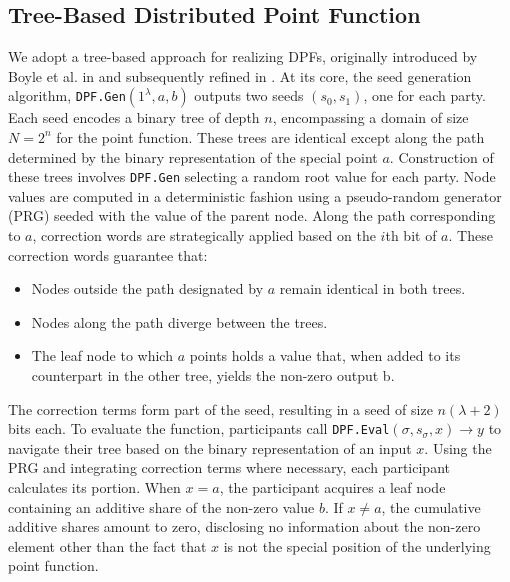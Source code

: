 \subsection{Tree-Based Distributed Point Function}
We adopt a tree-based approach for realizing DPFs, originally introduced by Boyle et al. in \cite{boyle2015function} and subsequently refined in \cite{boyle2016function}. At its core, the seed generation algorithm, \texttt{DPF.Gen}$(1^\lambda, a, b)$ outputs two seeds $(s_0, s_1)$, one for each party. Each seed encodes a binary tree of depth $n$, encompassing a domain of size $N=2^n$ for the point function. These trees are identical except along the path determined by the binary representation of the special point $a$. Construction of these trees involves \texttt{DPF.Gen} selecting a random root value for each party. Node values are computed in a deterministic fashion using a pseudo-random generator (PRG) seeded with the value of the parent node. Along the path corresponding to $a$, correction words are strategically applied based on the $i$th bit of $a$. These correction words guarantee that:
\begin{itemize}
\item Nodes outside the path designated by $a$ remain identical in both trees. 
\item Nodes along the path diverge between the trees.
\item The leaf node to which $a$ points holds a value that, when added to its counterpart in the other tree, yields the non-zero output b.
\end{itemize}
The correction terms form part of the seed, resulting in a seed of size $n(\lambda+2)$ bits each. To evaluate the function, participants call \texttt{DPF.Eval}$(\sigma, s_\sigma, x) \rightarrow y$ to navigate their tree based on the binary representation of an input $x$. Using the PRG and integrating correction terms where necessary, each participant calculates its portion. When $x=a$, the participant acquires a leaf node containing an additive share of the non-zero value $b$. If $x\neq a$, the cumulative additive shares amount to zero, disclosing no information about the non-zero element other than the fact that $x$ is not the special position of the underlying point function.


